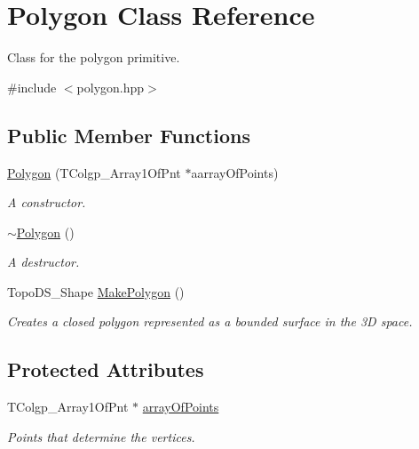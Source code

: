 \hypertarget{class_polygon}{
\section{Polygon Class Reference}
\label{class_polygon}
}


Class for the polygon primitive.  




{\ttfamily \#include $<$polygon.hpp$>$}

\subsection*{Public Member Functions}
\begin{DoxyCompactItemize}
\item 
\hyperlink{class_polygon_a4208e6c38149dea0bbc682f6ef48b633}{Polygon} (TColgp\_\-Array1OfPnt $\ast$aarrayOfPoints)
\begin{DoxyCompactList}\small\item\em A constructor. \item\end{DoxyCompactList}\item 
\hyperlink{class_polygon_ace39c67107966db12e13a183f496c3b0}{$\sim$Polygon} ()
\begin{DoxyCompactList}\small\item\em A destructor. \item\end{DoxyCompactList}\item 
TopoDS\_\-Shape \hyperlink{class_polygon_a0895f63cb18b1542d4f35937cea04134}{MakePolygon} ()
\begin{DoxyCompactList}\small\item\em Creates a closed polygon represented as a bounded surface in the 3D space. \item\end{DoxyCompactList}\end{DoxyCompactItemize}
\subsection*{Protected Attributes}
\begin{DoxyCompactItemize}
\item 
TColgp\_\-Array1OfPnt $\ast$ \hyperlink{class_polygon_a2a907e1325d587bb068b3a20f005d917}{arrayOfPoints}
\begin{DoxyCompactList}\small\item\em Points that determine the vertices. \item\end{DoxyCompactList}\end{DoxyCompactItemize}


